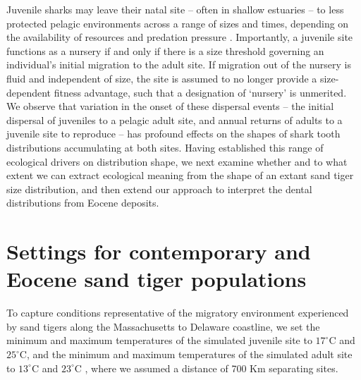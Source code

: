 \documentclass[]{rsos}%
\begin{document}
Juvenile sharks may leave their natal site -- often in shallow estuaries \cite{Kneebone2012, heupel2007shark} -- to less protected pelagic environments across a range of sizes and times, depending on the availability of resources and predation pressure \cite{heupel2014sizing}.
Importantly, a juvenile site functions as a nursery if and only if there is a size threshold governing an individual's initial migration to the adult site. 
If migration out of the nursery is fluid and independent of size, the site is assumed to no longer provide a size-dependent fitness advantage, such that a designation of `nursery' is unmerited.
We observe that variation in the onset of these dispersal events -- the initial dispersal of juveniles to a pelagic adult site, and annual returns of adults to a juvenile site to reproduce -- has profound effects on the shapes of shark tooth distributions accumulating at both sites.
Having established this range of ecological drivers on distribution shape, we next examine whether and to what extent we can extract ecological meaning from the shape of an extant sand tiger size distribution, and then extend our approach to interpret the dental distributions from Eocene deposits.

\section{Settings for contemporary and Eocene sand tiger populations}

To capture conditions representative of the migratory environment experienced by sand tigers along the Massachusetts to Delaware coastline, we set the minimum and maximum temperatures of the simulated juvenile site to $17^\circ$C and $25^\circ$C, and the minimum and maximum temperatures of the simulated adult site to $13^\circ$C and $23^\circ$C \cite{Teter2015, haulsee2018spatial, Kneebone2012}, where we assumed a distance of 700 Km separating sites. 
\end{document}
